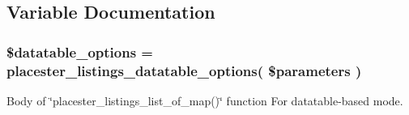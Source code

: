 \subsection{Variable Documentation}
\hypertarget{listings__list__of__map__datatable_8php_ac481557faa1530c1ca3c5230aa250ca5}{
\subsubsection[{\$datatable\_\-options}]{\setlength{\rightskip}{0pt plus 5cm}\$datatable\_\-options = placester\_\-listings\_\-datatable\_\-options( \$parameters )}}
\label{d2/dd4/listings__list__of__map__datatable_8php_ac481557faa1530c1ca3c5230aa250ca5}


Body of \char`\"{}placester\_\-listings\_\-list\_\-of\_\-map()\char`\"{} function For datatable-\/based mode. 

